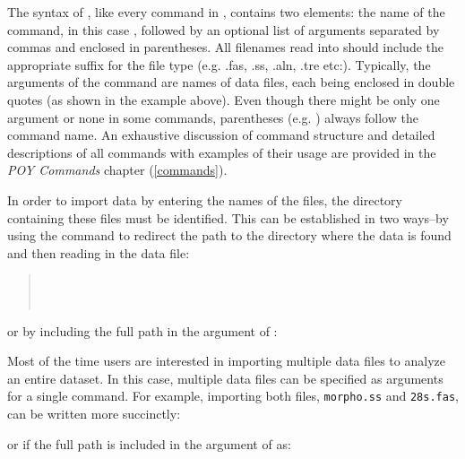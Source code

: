 {The syntax of , like every command in \poy, contains two elements: the name of the command, in this case , followed by an optional list of arguments 
separated by commas and enclosed in parentheses. All filenames read into \poy should include the appropriate suffix for the file type (e.g. .fas, .ss, .aln, .tre etc:).  Typically, the arguments of the command  are names of data files, each being enclosed in double quotes (as shown in the example above). Even though there might be only one argument or none in some commands, parentheses (e.g. ) always follow the command name. An exhaustive discussion of \poy command structure and detailed descriptions of all commands with examples of their usage are provided in the \emph{POY Commands} chapter (\ref{commands}).

In order to import data by entering the names of the files, the directory containing these files must be identified.  This can be established in two ways--by using the command  to redirect the path to the directory where the data is found and then reading in the data file:\\
\begin{quote}
\\
\\
\end{quote}
or by including the full path in the argument of :\\
\begin{quote}
\end{quote}

Most of the time users are interested in importing multiple data files to analyze an entire dataset. In this case, multiple data files can be specified as arguments for a single command. For example, importing both files, \texttt{morpho.ss} and \texttt{28s.fas}, can be written more succinctly:\\
\begin{quote}
\end{quote}
or if the full path is included in the argument of  as: \\

\begin{quote}
\end{quote}

}
